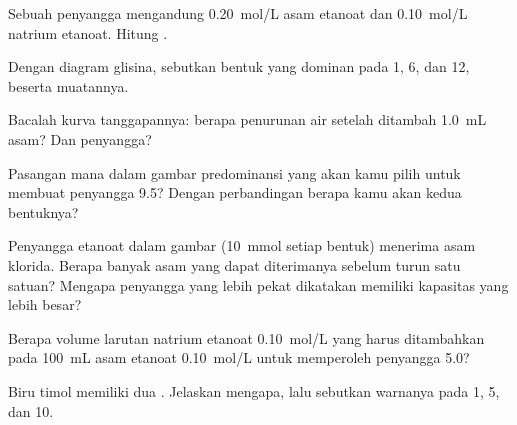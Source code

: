 \begin{exercise}[$\star\star$]\label{exo:g12:buffers-predominance:8}
Sebuah penyangga mengandung \qty{0.20}{mol/L} asam etanoat dan
\qty{0.10}{mol/L} natrium etanoat. Hitung .
\end{exercise}

\begin{exercise}[$\star\star$]\label{exo:g12:buffers-predominance:9}
Dengan diagram glisina, sebutkan bentuk yang dominan pada  1, 6, dan
12, beserta muatannya.
\end{exercise}

\begin{exercise}[$\star\star$]\label{exo:g12:buffers-predominance:10}
Bacalah kurva tanggapannya: berapa penurunan  air setelah ditambah
\qty{1.0}{mL} asam? Dan  penyangga?
\end{exercise}

\begin{exercise}[$\star\star$]\label{exo:g12:buffers-predominance:11}
Pasangan mana dalam gambar predominansi yang akan kamu pilih untuk
membuat penyangga  9.5? Dengan perbandingan berapa kamu akan 
kedua bentuknya?
\end{exercise}

\begin{exercise}[$\star\star\star$]\label{exo:g12:buffers-predominance:12}
Penyangga etanoat dalam gambar (\qty{10}{mmol} setiap bentuk) menerima
asam klorida. Berapa banyak asam yang dapat diterimanya sebelum 
turun satu satuan? Mengapa penyangga yang lebih pekat dikatakan memiliki
kapasitas yang lebih besar?
\end{exercise}

\begin{exercise}[$\star\star\star$]\label{exo:g12:buffers-predominance:13}
Berapa volume larutan natrium etanoat \qty{0.10}{mol/L} yang harus
ditambahkan pada \qty{100}{mL} asam etanoat \qty{0.10}{mol/L} untuk
memperoleh penyangga  5.0?
\end{exercise}

\begin{exercise}[$\star\star\star$]\label{exo:g12:buffers-predominance:14}
Biru timol memiliki dua . Jelaskan mengapa, lalu
sebutkan warnanya pada  1, 5, dan 10.
\end{exercise}

